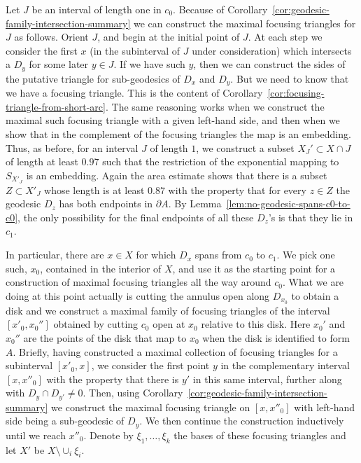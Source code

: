 Let $J$ be an interval of length one in $c_0$. Because of
Corollary~\ref{cor:geodesic-family-intersection-summary} we can  construct the maximal focusing
triangles for $J$ as follows. Orient $J$, and begin at the initial
point of $J$. At each step we consider the first $x$ (in the
subinterval of $J$ under consideration) which intersects a $D_y$ for
some later $y\in J$. If we have such $y$, then we can construct the
sides of the putative triangle for sub-geodesics of $D_x$ and $D_y$.
But we need to know that we have a focusing triangle. This is the
content of Corollary~\ref{cor:focusing-triangle-from-short-arc}. The same reasoning works when we
construct the maximal such focusing triangle with a given left-hand
side, and then when we show that in the complement of the focusing
triangles the map is an embedding. Thus, as before, for an interval
$J$  of length $1$, we construct a subset $X_J'\subset X\cap J$ of
length at least $0.97$ such that the restriction of the exponential
mapping to $S_{X'_J}$ is an embedding. Again the area estimate shows
that there is a subset $Z\subset X'_J$ whose length is at least
$0.87$ with the property that for every $z\in Z$ the geodesic $D_z$
has both endpoints in $\partial A$. By Lemma~\ref{lem:no-geodesic-spans-c0-to-c0}, the
only possibility for the final endpoints of all these $D_z$'s is
that they lie in $c_1$.


In particular, there are $x\in X$ for which $D_x$ spans from $c_0$
to $c_1$. We pick one such, $x_0$, contained in the interior of $X$,
and use it as the starting point for a construction of maximal
focusing triangles all the way around $c_0$. What we are doing at
this point actually is cutting the annulus open along $D_{x_0}$ to
obtain a disk and we construct a maximal family of focusing
triangles of the interval $[x'_0,x_0'']$ obtained by cutting $c_0$
open at $x_0$ relative to this disk. Here $x_0'$ and $x_0''$ are the
points of the disk that map to $x_0$ when the disk is identified to
form $A$. Briefly, having constructed a maximal collection of
focusing triangles for a subinterval $[x'_0,x]$, we consider the
first point $y$ in the complementary interval $[x,x''_0]$ with the
property that there is $y'$ in this same interval, further along
with $D_y\cap D_{y'}\not=0$. Then, using
Corollary~\ref{cor:geodesic-family-intersection-summary} we construct the maximal focusing
triangle on $[x,x''_0]$ with left-hand side being a sub-geodesic of
$D_y$. We then continue the construction inductively until we reach
$x''_0$. Denote by $\xi_1,\ldots,\xi_k$ the bases of these focusing
triangles and let $X'$ be $X\setminus\cup_i\xi_i$.

